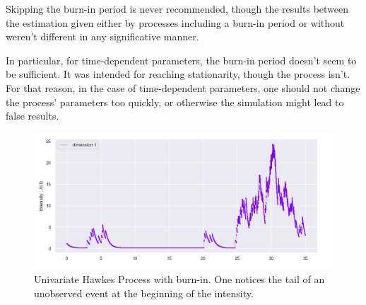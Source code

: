 \begin{remarque}
Skipping the burn-in period is never recommended, though the results between the estimation given either by processes including a burn-in period or without weren't different in any significative manner.
\end{remarque}

In particular, for time-dependent parameters, the burn-in period doesn't seem to be sufficient. It was intended for reaching stationarity, though the process isn't. For that reason, in the case of time-dependent parameters, one should not change the process' parameters too quickly, or otherwise the simulation might lead to false results.

\begin{figure}
\centering
\includegraphics[width = 0.99 \textwidth]{../imag/burnin.png}
\caption{Univariate Hawkes Process with burn-in. One notices the tail of an unobserved event at the beginning of the intensity.}
\label{fig:burn-in}
\end{figure}









